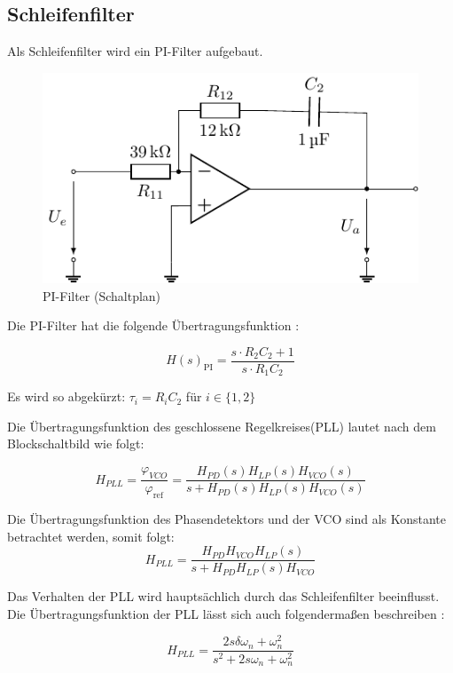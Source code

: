 \subsection{Schleifenfilter}

Als Schleifenfilter wird ein PI-Filter aufgebaut.

\begin{figure}[H]
  \centering
  \includegraphics[width=0.4\linewidth]{Elektronik-Laborprotokoll_PLL/Abbildungen/Schleifenfilter_Schaltung.pdf}
  \caption{PI-Filter (Schaltplan)}
  \label{fig:PI-Filter_Schaltung}
\end{figure}

Die PI-Filter hat die folgende Übertragungsfunktion  \cite{SkriptElektronik}:

\begin{equation}
H(s)_{\text{PI}} = \frac{s \cdot R_2 C_2 + 1}{s \cdot R_1 C_2}
\end{equation}

Es wird so abgekürzt: $\tau_i=R_i C_2$ für $i\in\{1,2\}$

Die Übertragungsfunktion des geschlossene Regelkreises(PLL) lautet nach dem Blockschaltbild \cite{Skript} wie folgt:

\begin{equation}
H_{PLL} = \frac{\varphi_{VCO}}{\varphi_{\text{ref}}} = \frac{H_{PD}(s) H_{LP}(s)H_{VCO}(s)}{s +H_{PD}(s)  H_{LP}(s)H_{VCO}(s)}
\end{equation}

Die Übertragungsfunktion des Phasendetektors und der VCO sind als Konstante betrachtet werden, somit folgt:
\begin{equation}
\label{eq:PLL_1}
H_{PLL} = \frac{H_{PD}H_{VCO}H_{LP}(s)}{s +H_{PD}  H_{LP}(s)H_{VCO}}
\end{equation}

Das Verhalten der PLL wird hauptsächlich durch das Schleifenfilter beeinflusst. Die Übertragungsfunktion der PLL lässt sich auch folgendermaßen beschreiben \cite{SkriptElektronik}:

\begin{equation}
\label{eq:PLL_2}
H_{PLL} = \frac{2s\delta\omega_n+\omega^2_n}{s^2+2s\omega_n+\omega^2_n}
\end{equation}

